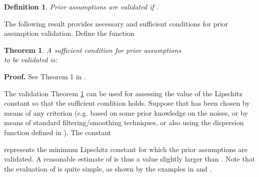 \documentclass[twocolumn,english,journal]{IEEEtran}
\newtheorem{theorem}{Theorem}
\newtheorem{definition}{Definition}
\begin{document}
\begin{definition} \label{Def:validation}Prior assumptions are validated
if . \end{definition}\medskip{}


The following result provides necessary and sufficient conditions
for prior assumption validation. Define the function \medskip{}


\begin{theorem} \label{fals}A sufficient condition for prior assumptions
\\
to be validated is: 

 \end{theorem}\medskip{}


\textbf{Proof.} See Theorem 1 in \cite{MiNoAUT04}.\medskip{}


The validation Theorem \ref{fals} can be used for assessing the value
of the Lipschitz constant  so that the sufficient condition
holds. Suppose that  has been chosen by means of any
criterion (e.g. based on some prior knowledge on the noises, or by
means of standard filtering/smoothing techniques, or also using the
dispersion function defined in \cite{MiNoCDC05}). The constant

represents the minimum Lipschitz constant for which the prior assumptions
are validated. A reasonable estimate of  is thus a value
slightly larger than . Note that the evaluation
of  is quite simple, as shown by the examples
in \cite{MiNoAUT04} and \cite{MiNoTAC05}.



\end{document}
